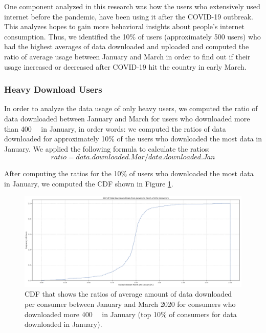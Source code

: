 \documentclass[conference,10pt]{IEEEtran}
\begin{document}
One component analyzed in this research was how the users who extensively used internet before the pandemic, have been using it after the COVID-19 outbreak. This analyzes hopes to gain more behavioral insights about people's internet consumption. Thus, we identified the 10\% of users (approximately 500 users) who had the highest averages of data downloaded and uploaded and computed the ratio of average usage between January and March in order to find out if their usage increased or decreased after COVID-19 hit the country in early March.

\subsubsection{Heavy Download Users}
\label{sec:heavy-download-users}

In order to analyze the data usage of only heavy users, we computed the ratio of data downloaded between January and March for users who downloaded more than \SI{400}{\giga\byte} in January, in order words: we computed the ratios of data downloaded for approximately 10\% of the users who downloaded the most data in January. We applied the following formula to calculate the ratios:
\begin{equation}
ratio= data.downloaded.Mar/ data.downloaded.Jan
\end{equation}

After computing the ratios for the 10\% of users who downloaded the most data in January, we computed the CDF shown in Figure \ref{fig:heavydown}.

\begin{figure}
\centering
\includegraphics[width=1.0\linewidth]{figs/heavydown.PNG}
\caption{CDF that shows the ratios of average amount of data downloaded per consumer between January and March 2020 for consumers who downloaded more \SI{400}{\giga\byte} in January (top 10\% of consumers for data downloaded in January).}
\label{fig:heavydown}
\end{figure}
\end{document}
